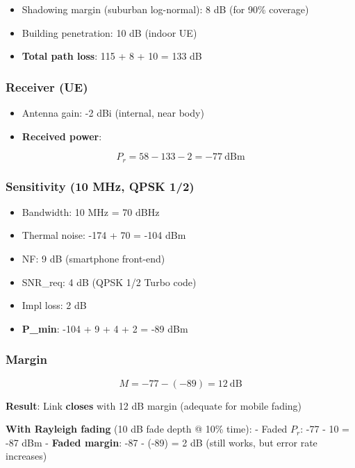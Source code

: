 \begin{itemize}
\tightlist
\item
  Shadowing margin (suburban log-normal): 8 dB (for 90\% coverage)
\item
  Building penetration: 10 dB (indoor UE)
\item
  \textbf{Total path loss}: 115 + 8 + 10 = 133 dB
\end{itemize}

\subsubsection{Receiver (UE)}\label{receiver-ue}

\begin{itemize}
\tightlist
\item
  Antenna gain: -2 dBi (internal, near body)
\item
  \textbf{Received power}:
\end{itemize}

\[
P_r = 58 - 133 - 2 = -77\ \text{dBm}
\]

\subsubsection{Sensitivity (10 MHz, QPSK
1/2)}\label{sensitivity-10-mhz-qpsk-12}

\begin{itemize}
\tightlist
\item
  Bandwidth: 10 MHz = 70 dBHz
\item
  Thermal noise: -174 + 70 = -104 dBm
\item
  NF: 9 dB (smartphone front-end)
\item
  SNR\_req: 4 dB (QPSK 1/2 Turbo code)
\item
  Impl loss: 2 dB
\item
  \textbf{P\_min}: -104 + 9 + 4 + 2 = -89 dBm
\end{itemize}

\subsubsection{Margin}\label{margin-1}

\[
M = -77 - (-89) = 12\ \text{dB}
\]

\textbf{Result}: Link \textbf{closes} with 12 dB margin (adequate for
mobile fading)

\textbf{With Rayleigh fading} (10 dB fade depth @ 10\% time): - Faded
\(P_r\): -77 - 10 = -87 dBm - \textbf{Faded margin}: -87 - (-89) = 2 dB
(still works, but error rate increases)


